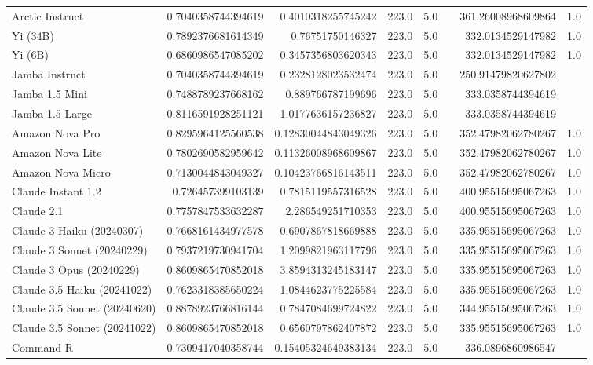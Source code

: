\begin{table}[htp]
{\begin{tabular}{lrrrrrrr}
Arctic Instruct & 0.7040358744394619 & 0.4010318255745242 & 223.0 & 5.0 &  & 361.26008968609864 & 1.0 \\
Yi (34B) & 0.7892376681614349 & 0.76751750146327 & 223.0 & 5.0 &  & 332.0134529147982 & 1.0 \\
Yi (6B) & 0.6860986547085202 & 0.3457356803620343 & 223.0 & 5.0 &  & 332.0134529147982 & 1.0 \\
Jamba Instruct & 0.7040358744394619 & 0.2328128023532474 & 223.0 & 5.0 &  & 250.91479820627802 &  \\
Jamba 1.5 Mini & 0.7488789237668162 & 0.889766787199696 & 223.0 & 5.0 &  & 333.0358744394619 &  \\
Jamba 1.5 Large & 0.8116591928251121 & 1.0177636157236827 & 223.0 & 5.0 &  & 333.0358744394619 &  \\
Amazon Nova Pro & 0.8295964125560538 & 0.12830044843049326 & 223.0 & 5.0 &  & 352.47982062780267 & 1.0 \\
Amazon Nova Lite & 0.7802690582959642 & 0.11326008968609867 & 223.0 & 5.0 &  & 352.47982062780267 & 1.0 \\
Amazon Nova Micro & 0.7130044843049327 & 0.10423766816143511 & 223.0 & 5.0 &  & 352.47982062780267 & 1.0 \\
Claude Instant 1.2 & 0.726457399103139 & 0.7815119557316528 & 223.0 & 5.0 &  & 400.95515695067263 & 1.0 \\
Claude 2.1 & 0.7757847533632287 & 2.286549251710353 & 223.0 & 5.0 &  & 400.95515695067263 & 1.0 \\
Claude 3 Haiku (20240307) & 0.7668161434977578 & 0.6907867818669888 & 223.0 & 5.0 &  & 335.95515695067263 & 1.0 \\
Claude 3 Sonnet (20240229) & 0.7937219730941704 & 1.2099821963117796 & 223.0 & 5.0 &  & 335.95515695067263 & 1.0 \\
Claude 3 Opus (20240229) & 0.8609865470852018 & 3.8594313245183147 & 223.0 & 5.0 &  & 335.95515695067263 & 1.0 \\
Claude 3.5 Haiku (20241022) & 0.7623318385650224 & 1.0844623775225584 & 223.0 & 5.0 &  & 335.95515695067263 & 1.0 \\
Claude 3.5 Sonnet (20240620) & 0.8878923766816144 & 0.7847084699724822 & 223.0 & 5.0 &  & 344.95515695067263 & 1.0 \\
Claude 3.5 Sonnet (20241022) & 0.8609865470852018 & 0.6560797862407872 & 223.0 & 5.0 &  & 335.95515695067263 & 1.0 \\
Command R & 0.7309417040358744 & 0.15405324649383134 & 223.0 & 5.0 &  & 336.0896860986547 &  \\

\end{tabular}}
\end{table}
